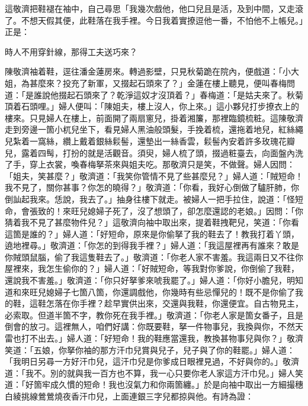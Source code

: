這敬濟把鞋褪在袖中，自己尋思「我幾次戲他，他口兒且是活，及到中間，又走滾了。不想天假其便，此鞋落在我手裡。今日我着實撩逗他一番，不怕他不上帳兒。」正是：

\begin{myquote}
時人不用穿針線，那得工夫送巧來？
\end{myquote}

陳敬濟袖着鞋，逕往潘金蓮房來。轉過影壁，只見秋菊跪在院內，便戲道：「小大姐，為甚麼來？投充了新軍，又掇起石頭來了？」{}金蓮在樓上聽見，便叫春梅問道：「是誰說他掇起石頭來了？乾淨這奴才沒頂着？」春梅道：「是姑夫來了。秋菊頂着石頭哩。」婦人便叫：「陳姐夫，樓上沒人，{}你上來。」這小夥兒打步撩衣上的樓來。只見婦人在樓上，前面開了兩扇窻兒，掛着湘簾，那裡臨鏡梳粧。這陳敬濟走到旁邊一箇小杌兒坐下，看見婦人黑油般頭髮，手挽着梳，還拖着地兒，紅絲繩兒紮着一窩絲，纘上戴着銀絲鬏髻，還墊出一絲香雲，鬏髻內安着許多玫瑰花瓣兒，露着四髩，打扮的就是活觀音。{}須臾，婦人梳了頭，掇過粧臺去，向面盤內洗了手，穿上衣裳，喚春梅拏茶來與姐夫吃。那敬濟只是笑，不做聲。{}婦人因問：「姐夫，笑甚麼？」敬濟道：「我笑你管情不見了些甚麼兒？」婦人道：「賊短命！我不見了，關你甚事？你怎的曉得？」敬濟道：「你看，我好心倒做了驢肝肺，你倒訕起我來。恁說，我去了。」抽身往樓下就走。被婦人一把手拉住，說道：「怪短命，會張致的！來旺兒媳婦子死了，沒了想頭了，卻怎麼還認的老娘。」{}因問：「你猜着我不見了甚麼物件兒？」這敬濟向袖中取出來，提着鞋拽靶兒，笑道：「你看這箇是誰的？」婦人道：「好短命，原來是你偷拏了我的鞋去了！教我打着丫頭，遶地裡尋。」敬濟道：「你怎的到得我手裡？」婦人道：「我這屋裡再有誰來？敢是你賊頭鼠腦，偷了我這隻鞋去了。」敬濟道：「你老人家不害羞。我這兩日又不往你屋裡來，我怎生偷你的？」婦人道：「好賊短命，等我對你爹說，你倒偷了我鞋，還說我不害羞。」敬濟道：「你只好拏爹來唬我罷了。」婦人道：「你好小膽兒，明知道和來旺兒媳婦子七箇八箇，你還調戲他，你幾時有些忌憚兒的！既不是你偷了我的鞋，這鞋怎落在你手裡？趁早實供出來，交還與我鞋，你還便宜。自古物見主，必索取。但道半箇不字，教你死在我手裡。」敬濟道：「你老人家是箇女番子，且是倒會的放刁。這裡無人，咱們好講：你既要鞋，拏一件物事兒，我換與你，不然天雷也打不出去。」婦人道：「好短命！我的鞋應當還我，教換甚物事兒與你？」敬濟笑道：「五娘，你拏你袖的那方汗巾兒賞與兒子，兒子與了你的鞋罷。」{}婦人道：「我明日另尋一方好汗巾兒，這汗巾兒是你爹成日眼裡見過，不好與你的。」敬濟道：「我不。別的就與我一百方也不算，我一心只要你老人家這方汗巾兒。」婦人笑道：「好箇牢成久慣的短命！我也沒氣力和你兩箇纏。」於是向袖中取出一方細撮穗白綾挑線鶯鶯燒夜香汗巾兒，上面連銀三字兒都掠與他。有詩為證：

